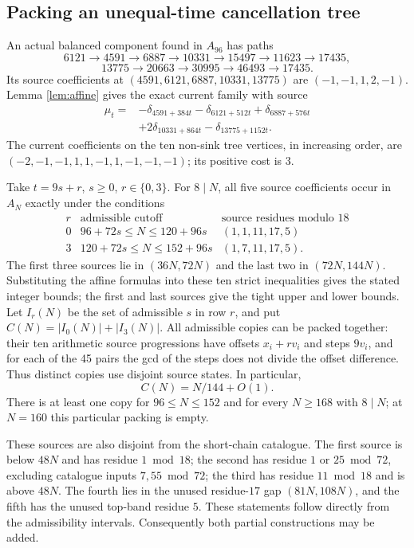 \documentclass[11pt]{article}
\begin{document}
\subsection{Packing an unequal-time cancellation tree}
An actual balanced component found in $A_{96}$ has paths
\[
6121\to4591\to6887\to10331\to15497\to11623\to17435,
\]
\[
13775\to20663\to30995\to46493\to17435.
\]
Its source coefficients at $(4591,6121,6887,10331,13775)$ are
$(-1,-1,1,2,-1)$. Lemma \ref{lem:affine} gives the exact current family
with source
\[
\begin{split}
\mu_t={}&-\delta_{4591+384t}-\delta_{6121+512t}
 +\delta_{6887+576t}\\
 &+2\delta_{10331+864t}-\delta_{13775+1152t}.
\end{split}
\]
The current coefficients on the ten non-sink tree vertices, in increasing
order, are $(-2,-1,-1,1,1,-1,1,-1,-1,-1)$; its positive cost is $3$.

Take $t=9s+r$, $s\ge0$, $r\in\{0,3\}$. For $8\mid N$, all five source
coefficients occur in $A_N$ exactly under the conditions
\[
\begin{array}{c|c|c}
r&\text{admissible cutoff}&
 \text{source residues modulo }18\\ \hline
0&96+72s\le N\le120+96s&(1,1,11,17,5)\\
3&120+72s\le N\le152+96s&(1,7,11,17,5).
\end{array}
\]
The first three sources lie in $(36N,72N)$ and the last two in
$(72N,144N)$. Substituting the affine formulas into these ten strict
inequalities gives the stated integer bounds; the first and last
sources give the tight upper and lower bounds.
Let $I_r(N)$ be the set of admissible $s$ in row $r$, and put
$C(N)=|I_0(N)|+|I_3(N)|$. All admissible copies can be packed together:
their ten arithmetic source progressions have offsets $x_i+rv_i$
and steps $9v_i$, and for each of the 45 pairs the gcd of the steps
does not divide the offset difference. Thus distinct copies use
disjoint source states. In particular,
\[
C(N)=N/144+O(1).
\]
There is at least one copy for $96\le N\le152$ and for every $N\ge168$
with $8\mid N$; at $N=160$ this particular packing is empty.

These sources are also disjoint from the short-chain catalogue.
The first source is below $48N$ and has residue $1\bmod18$;
the second has residue $1$ or $25\bmod72$, excluding catalogue
inputs $7,55\bmod72$; the third has residue $11\bmod18$ and is
above $48N$. The fourth lies in the unused residue-$17$ gap
$(81N,108N)$, and the fifth has the unused top-band residue $5$.
These statements follow directly from the admissibility intervals.
Consequently both partial constructions may be added.
\end{document}
